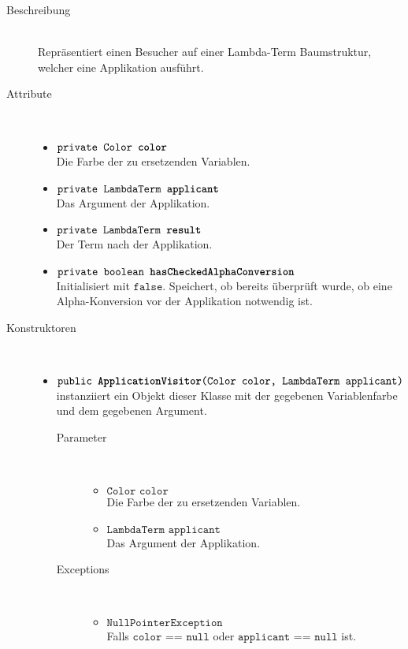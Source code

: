 \begin{description}
\item[Beschreibung] \hfill \\ Repräsentiert einen Besucher auf einer Lambda-Term Baumstruktur, welcher eine Applikation ausführt.

\item[Attribute] \hfill \\
	\vspace{-.8cm}
	\begin{itemize}
		\item $\texttt{private Color \textbf{color}}$ \\ Die Farbe der zu ersetzenden Variablen.
		\item $\texttt{private LambdaTerm \textbf{applicant}}$ \\ Das Argument der Applikation.
		\item $\texttt{private LambdaTerm \textbf{result}}$ \\ Der Term nach der Applikation.
		\item $\texttt{private boolean \textbf{hasCheckedAlphaConversion}}$ \\ Initialisiert mit $\texttt{false}$. Speichert, ob bereits überprüft wurde, ob eine Alpha-Konversion vor der Applikation notwendig ist.
	\end{itemize}

\item[Konstruktoren] \hfill \\
	\vspace{-.8cm}
	\begin{itemize}
		\item $\texttt{public \textbf{ApplicationVisitor}(Color color, LambdaTerm applicant)}$ \\ instanziiert ein Objekt dieser Klasse mit der gegebenen Variablenfarbe und dem gegebenen Argument.
		\begin{description}
			\item[Parameter] \hfill \\
			\vspace{-.8cm}
			\begin{itemize}
				\item $\texttt{Color color}$ \\ Die Farbe der zu ersetzenden Variablen.
				\item $\texttt{LambdaTerm applicant}$ \\ Das Argument der Applikation.
			\end{itemize}
			\item[Exceptions] \hfill \\
			\vspace{-.8cm}
			\begin{itemize}
				\item $\texttt{NullPointerException}$ \\ Falls $\texttt{color == null}$ oder $\texttt{applicant == null}$ ist.
			\end{itemize}
		\end{description}
	\end{itemize}


\end{description}
